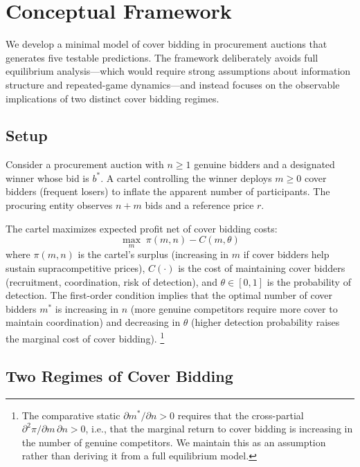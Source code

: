 \section{Conceptual Framework}
\label{sec:conceptual}

We develop a minimal model of cover bidding in procurement auctions that
generates five testable predictions. The framework deliberately avoids
full equilibrium analysis---which would require strong assumptions about
information structure and repeated-game dynamics---and instead focuses on
the observable implications of two distinct cover bidding regimes.

\subsection{Setup}

Consider a procurement auction with $n \geq 1$ genuine bidders and a
designated winner whose bid is $b^*$. A cartel controlling the winner
deploys $m \geq 0$ cover bidders (frequent losers) to inflate the
apparent number of participants. The procuring entity observes $n + m$
bids and a reference price $r$.

The cartel maximizes expected profit net of cover bidding costs:
\begin{equation}
  \max_{m} \; \pi(m, n) - C(m, \theta)
  \label{eq:cartel_foc}
\end{equation}
where $\pi(m, n)$ is the cartel's surplus (increasing in $m$ if cover
bidders help sustain supracompetitive prices), $C(\cdot)$ is the cost of
maintaining cover bidders (recruitment, coordination, risk of detection),
and $\theta \in [0,1]$ is the probability of detection. The first-order
condition implies that the optimal number of cover bidders $m^*$ is
increasing in $n$ (more genuine competitors require more cover to
maintain coordination) and decreasing in $\theta$ (higher detection
probability raises the marginal cost of cover bidding).%
\footnote{The comparative static $\partial m^* / \partial n > 0$ %
requires that the cross-partial $\partial^2 \pi / \partial m \, \partial n > 0$,
i.e., that the marginal return to cover bidding is increasing in the
number of genuine competitors. We maintain this as an assumption rather
than deriving it from a full equilibrium model.}

\subsection{Two Regimes of Cover Bidding}


